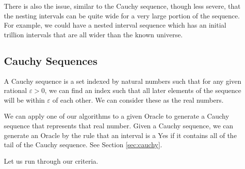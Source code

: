 \documentclass[12pt]{article}
\begin{document}
There is also the issue, similar to the Cauchy sequence, though less severe, that the nesting intervals can be quite wide for a very large portion of the sequence.  For example, we could have a nested interval sequence which has an initial trillion intervals that are all wider than the known universe. 


\subsection{Cauchy Sequences}

A Cauchy sequence is a set indexed by natural numbers such that for any given rational $\varepsilon > 0$, we can find an index such that all later elements of the sequence will be within $\varepsilon$ of each other. We can consider these as the real numbers. 

We can apply one of our algorithms to a given Oracle to generate a Cauchy sequence that represents that real number. Given a Cauchy sequence, we can generate an Oracle by the rule that an interval is a Yes if it contains all of the tail of the Cauchy sequence. See Section \ref{sec:cauchy}.

Let us run through our criteria. 
\end{document}
